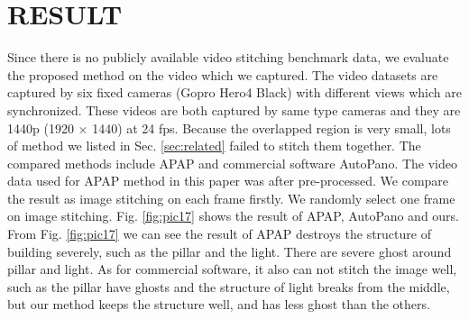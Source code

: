 \documentclass[conference]{IEEEtran}
\begin{document}
\section{RESULT}
\label{sec:result}

Since there is no publicly available video stitching benchmark data, we evaluate the proposed method on the 
video which we captured.  The video datasets are captured by six fixed cameras (Gopro Hero4 Black) with different views which are synchronized. 
These videos are both captured by same type cameras and they are 1440p (1920 $\times$ 1440) at 24 fps.
Because the overlapped region is very small, lots of method we listed in Sec. \ref{sec:related} failed to stitch them together.
The compared methods include APAP and commercial software AutoPano. The video data used for APAP method in this paper was after pre-processed. We compare the result as image stitching on each frame firstly.
We randomly select one frame on image stitching. Fig. \ref{fig:pic17} shows the result of APAP, AutoPano and ours. 
From Fig. \ref{fig:pic17} we can see the result of APAP 
destroys the structure of building severely, such as the pillar and the light. There are severe ghost around pillar and light.
As for commercial software, it also can not stitch the image well, such as the pillar have ghosts and the structure of light breaks from the middle, 
but our method keeps the structure well, and has less ghost than the others.
\end{document}
